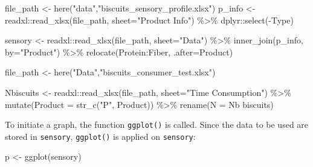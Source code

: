 \documentclass[
]{krantz}
\makeatletter
\newenvironment{Shaded}{\begin{snugshade}}{\end{snugshade}}
\newcommand{\AttributeTok}[1]{\textcolor[rgb]{0.61,0.61,0.61}{#1}}
\newcommand{\FunctionTok}[1]{\textcolor[rgb]{0,0,0}{#1}}
\newcommand{\NormalTok}[1]{#1}
\newcommand{\OtherTok}[1]{\textcolor[rgb]{0.37,0.37,0.37}{#1}}
\newcommand{\SpecialCharTok}[1]{\textcolor[rgb]{0,0,0}{#1}}
\newcommand{\StringTok}[1]{\textcolor[rgb]{0.5,0.5,0.5}{#1}}
\newenvironment{kframe}{%
\medskip{}
\setlength{\fboxsep}{.8em}
 \def\at@end@of@kframe{}%
 \ifinner\ifhmode%
  \def\at@end@of@kframe{\end{minipage}}%
  \begin{minipage}{\columnwidth}%
 \fi\fi%
 \def\FrameCommand##1{\hskip\@totalleftmargin \hskip-\fboxsep
 \colorbox{shadecolor}{##1}\hskip-\fboxsep
     \hskip-\linewidth \hskip-\@totalleftmargin \hskip\columnwidth}%
 \MakeFramed {\advance\hsize-\width
   \@totalleftmargin\z@ \linewidth\hsize
   \@setminipage}}%
 {\par\unskip\endMakeFramed%
 \at@end@of@kframe}
\renewenvironment{Shaded}{\begin{kframe}}{\end{kframe}}
\makeatother
\begin{document}
\begin{Shaded}
\begin{Highlighting}[]
\NormalTok{file\_path }\OtherTok{\textless{}{-}} \FunctionTok{here}\NormalTok{(}\StringTok{"data"}\NormalTok{,}\StringTok{"biscuits\_sensory\_profile.xlsx"}\NormalTok{) }
\NormalTok{p\_info }\OtherTok{\textless{}{-}}\NormalTok{ readxl}\SpecialCharTok{::}\FunctionTok{read\_xlsx}\NormalTok{(file\_path, }\AttributeTok{sheet=}\StringTok{"Product Info"}\NormalTok{) }\SpecialCharTok{\%\textgreater{}\%} 
\NormalTok{  dplyr}\SpecialCharTok{::}\FunctionTok{select}\NormalTok{(}\SpecialCharTok{{-}}\NormalTok{Type)}

\NormalTok{sensory }\OtherTok{\textless{}{-}}\NormalTok{ readxl}\SpecialCharTok{::}\FunctionTok{read\_xlsx}\NormalTok{(file\_path, }\AttributeTok{sheet=}\StringTok{"Data"}\NormalTok{) }\SpecialCharTok{\%\textgreater{}\%} 
  \FunctionTok{inner\_join}\NormalTok{(p\_info, }\AttributeTok{by=}\StringTok{"Product"}\NormalTok{) }\SpecialCharTok{\%\textgreater{}\%} 
  \FunctionTok{relocate}\NormalTok{(Protein}\SpecialCharTok{:}\NormalTok{Fiber, }\AttributeTok{.after=}\NormalTok{Product)}

\NormalTok{file\_path }\OtherTok{\textless{}{-}} \FunctionTok{here}\NormalTok{(}\StringTok{"Data"}\NormalTok{,}\StringTok{"biscuits\_consumer\_test.xlsx"}\NormalTok{)}

\NormalTok{Nbiscuits }\OtherTok{\textless{}{-}}\NormalTok{ readxl}\SpecialCharTok{::}\FunctionTok{read\_xlsx}\NormalTok{(file\_path, }\AttributeTok{sheet=}\StringTok{"Time Consumption"}\NormalTok{) }\SpecialCharTok{\%\textgreater{}\%} 
  \FunctionTok{mutate}\NormalTok{(}\AttributeTok{Product =} \FunctionTok{str\_c}\NormalTok{(}\StringTok{"P"}\NormalTok{, Product)) }\SpecialCharTok{\%\textgreater{}\%} 
  \FunctionTok{rename}\NormalTok{(}\AttributeTok{N =} \StringTok{\textasciigrave{}}\AttributeTok{Nb biscuits}\StringTok{\textasciigrave{}}\NormalTok{)}
\end{Highlighting}
\end{Shaded}

To initiate a graph, the function \texttt{ggplot()} is called.
Since the data to be used are stored in \texttt{sensory}, \texttt{ggplot()} is applied on \texttt{sensory}:

\begin{Shaded}
\begin{Highlighting}[]
\NormalTok{p }\OtherTok{\textless{}{-}} \FunctionTok{ggplot}\NormalTok{(sensory)}
\end{Highlighting}
\end{Shaded}
\end{document}
